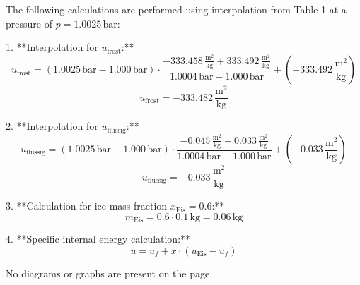 The following calculations are performed using interpolation from Table 1 at a pressure of \( p = 1.0025 \, \text{bar} \):  

1. **Interpolation for \( u_{\text{frost}} \):**  
\[
u_{\text{frost}} = (1.0025 \, \text{bar} - 1.000 \, \text{bar}) \cdot \frac{-333.458 \, \frac{\text{m}^2}{\text{kg}} + 333.492 \, \frac{\text{m}^2}{\text{kg}}}{1.0004 \, \text{bar} - 1.000 \, \text{bar}} + (-333.492 \, \frac{\text{m}^2}{\text{kg}})
\]  
\[
u_{\text{frost}} = -333.482 \, \frac{\text{m}^2}{\text{kg}}
\]  

2. **Interpolation for \( u_{\text{flüssig}} \):**  
\[
u_{\text{flüssig}} = (1.0025 \, \text{bar} - 1.000 \, \text{bar}) \cdot \frac{-0.045 \, \frac{\text{m}^2}{\text{kg}} + 0.033 \, \frac{\text{m}^2}{\text{kg}}}{1.0004 \, \text{bar} - 1.000 \, \text{bar}} + (-0.033 \, \frac{\text{m}^2}{\text{kg}})
\]  
\[
u_{\text{flüssig}} = -0.033 \, \frac{\text{m}^2}{\text{kg}}
\]  

3. **Calculation for ice mass fraction \( x_{\text{Eis}} = 0.6 \):**  
\[
m_{\text{Eis}} = 0.6 \cdot 0.1 \, \text{kg} = 0.06 \, \text{kg}
\]  

4. **Specific internal energy calculation:**  
\[
u = u_f + x \cdot (u_{\text{Eis}} - u_f)
\]  

No diagrams or graphs are present on the page.